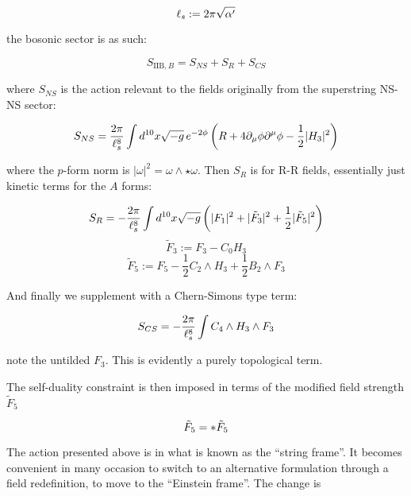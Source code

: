 \begin{equation}
	\ell_s := 2\pi \sqrt{\alpha'}
	\label{}
\end{equation}

the bosonic sector is as such:

\begin{equation} S_{\text{IIB},B} = S_{NS} + S_R + S_{CS} \label{iibsugraS}\end{equation}

where $S_{NS}$ is the action relevant to the fields originally from the superstring NS-NS sector:

\begin{equation}
S_{NS} = \frac{2\pi}{\ell_s^8} \int d^{10} x \sqrt{-g} \, e^{-2\phi} \left( R + 4 \partial_\mu \phi \partial^\mu \phi - \frac{1}{2} | H_3 |^2 \right) 
\end{equation}

where the $p$-form norm is $|\omega|^2 = \omega \wedge \star \omega$. Then $S_R$ is for R-R fields, essentially just kinetic terms for the $A$ forms:

\begin{equation}
	S_R = -\frac{2\pi}{\ell_s^8} \int d^{10} x \sqrt{-g} 
\left(| F_1 |^2 + | \tilde{F}_3 |^2 + \frac{1}{2}| \tilde{F}_5 |^2 \right)
\end{equation}
\begin{equation}
	\tilde{F}_3 := F_3 - C_0 H_3
\end{equation}
\begin{equation}
	\tilde{F}_5 := F_5 - \frac{1}{2} C_2 \wedge H_3 + \frac{1}{2} B_2 \wedge F_3
\end{equation}

And finally we supplement with a Chern-Simons type term:

\begin{equation}
S_{CS} = -\frac{2\pi}{\ell_s^8} \int C_4 \wedge H_3 \wedge F_3 
\end{equation}

note the untilded $F_3$. This is evidently a purely topological term.

The self-duality constraint is then imposed in terms of the modified field strength $\tilde F_5$

\begin{equation}
	\tilde F_5 = \ast \tilde F_5
	\label{}
\end{equation}

The action presented above is in what is known as the ``string frame''. It becomes convenient in many occasion to switch to an alternative formulation through a field redefinition, to move to the ``Einstein frame''. The change is

